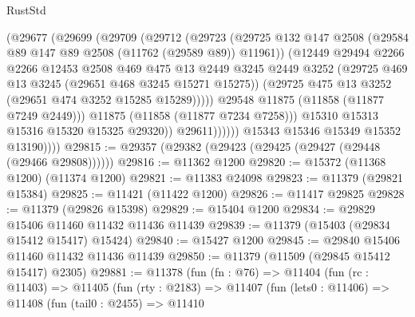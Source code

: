 \begin{lexlean}{RustStd}
\begin{coremodule}
                          (@29677
                            (@29699
                              (@29709
                                (@29712
                                  (@29723
                                    (@29725
                                      @132
                                      @147
                                      @2508
                                      (@29584 @89 @147 @89 @2508 (@11762 (@29589 @89)) @11961))
                                    (@12449
                                      @29494
                                      @2266
                                      @2266
                                      @12453
                                      @2508
                                      @469
                                      @475
                                      @13
                                      @2449
                                      @3245
                                      @2449
                                      @3252
                                      (@29725 @469 @13 @3245 (@29651 @468 @3245 @15271 @15275))
                                      (@29725 @475 @13 @3252 (@29651 @474 @3252 @15285 @15289)))))
                                @29548
                                @11875
                                (@11858 (@11877 @7249 @2449)))
                              @11875
                              (@11858 (@11877 @7234 @7258)))
                            @15310
                            @15313
                            @15316
                            @15320
                            @15325
                            @29320))
                        @29611))))))
            @15343
            @15346
            @15349
            @15352
            @13190))))
@29815 := @29357 (@29382 (@29423 (@29425 (@29427 (@29448 (@29466 @29808))))))
@29816 := @11362 @1200
@29820 := @15372 (@11368 @1200) (@11374 @1200)
@29821 := @11383 @24098
@29823 := @11379 (@29821 @15384)
@29825 := @11421 (@11422 @1200)
@29826 := @11417 @29825
@29828 := @11379 (@29826 @15398)
@29829 := @15404 @1200
@29834 := @29829 @15406 @11460 @11432 @11436 @11439
@29839 := @11379 (@15403 (@29834 @15412 @15417) @15424)
@29840 := @15427 @1200
@29845 := @29840 @15406 @11460 @11432 @11436 @11439
@29850 := @11379 (@11509 (@29845 @15412 @15417) @2305)
@29881 := @11378
    (fun (fn : @76) =>
    @11404
      (fun (rc : @11403) =>
      @11405
        (fun (rty : @2183) =>
        @11407
          (fun (lets0 : @11406) =>
          @11408
            (fun (tail0 : @2455) =>
            @11410

\end{coremodule}
\end{lexlean}
